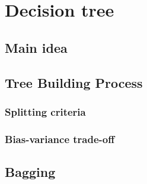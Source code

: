 \section{Decision tree}

\subsection{Main idea}

\subsection{Tree Building Process}

\subsubsection{Splitting criteria}


\subsubsection{Bias-variance trade-off}


\subsection{Bagging}
